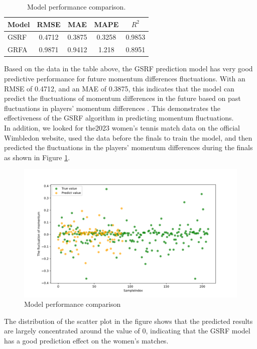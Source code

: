 \documentclass[12pt]{article}%
\begin{document}
\begin{table}[ht]
	\centering
	\begin{tabular}{lcccc}
		\hline
		\rowcolor{green!30}
		{Model} & {RMSE} & {MAE} & {MAPE} & {$R^2$} \\
		\hline
		\rowcolor{yellow!30}
		GSRF & 0.4712 & 0.3875 & 0.3258 & 0.9853 \\
		\rowcolor{yellow!30}
		GRFA & 0.9871 & 0.9412 & 1.218 & 0.8951 \\
		\hline
	\end{tabular}
	\caption{Model performance comparison.}
	\label{table:model_performance}
\end{table}

Based on the data in the table above, the GSRF prediction model has very good predictive performance for future momentum differences fluctuations. With an RMSE of 0.4712, and an MAE of 0.3875, this indicates that the model can predict the fluctuations of momentum differences in the future based on past fluctuations in players' momentum differences 	\cite{sipko2015machine} . This demonstrates the effectiveness of the GSRF algorithm in predicting momentum fluctuations. \\ 

In addition, we looked for the2023 women's tennis match data on the official Wimbledon website, used the data before the finals to train the model, and then predicted the fluctuations in the players' momentum differences during the finals as shown in Figure \ref{sl3}.

\begin{figure}[H]
	\centering
	\includegraphics[scale=0.56]{figure//sl3.png}
	\caption{Model performance comparison}
	\label{sl3}
\end{figure}
The distribution of the scatter plot in the figure shows that the predicted results are largely concentrated around the value of 0, indicating that the GSRF model has a good prediction effect on the women's matches.
\end{document}
